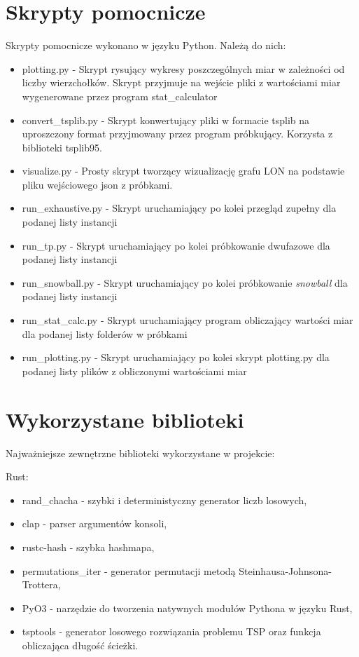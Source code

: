 \section{Skrypty pomocnicze}
Skrypty pomocnicze wykonano w języku Python.
Należą do nich:
\begin{itemize}
    \item plotting.py - Skrypt rysujący wykresy poszczególnych miar w zależności od liczby wierzchołków. Skrypt przyjmuje na wejście pliki z wartościami miar wygenerowane przez program stat\_calculator
    \item convert\_tsplib.py - Skrypt konwertujący pliki w formacie tsplib na uproszczony format przyjmowany przez program próbkujący. Korzysta z biblioteki tsplib95.
    \item visualize.py - Prosty skrypt tworzący wizualizację grafu LON na podstawie pliku wejściowego json z próbkami.
    \item run\_exhaustive.py - Skrypt uruchamiający po kolei przegląd zupełny dla podanej listy instancji
    \item run\_tp.py - Skrypt uruchamiający po kolei próbkowanie dwufazowe dla podanej listy instancji
    \item run\_snowball.py - Skrypt uruchamiający po kolei próbkowanie \textit{snowball} dla podanej listy instancji
    \item run\_stat\_calc.py - Skrypt uruchamiający program obliczający wartości miar dla podanej listy folderów w próbkami
    \item run\_plotting.py - Skrypt uruchamiający po kolei skrypt plotting.py dla podanej listy plików z obliczonymi wartościami miar
\end{itemize}

\section{Wykorzystane biblioteki}
Najważniejsze zewnętrzne biblioteki wykorzystane w projekcie:
\vspace{1em}

Rust:
\begin{itemize}
    \item rand\_chacha - szybki i deterministyczny generator liczb losowych,
    \item clap - parser argumentów konsoli,
    \item rustc-hash - szybka hashmapa,
    \item permutations\_iter - generator permutacji metodą Steinhausa-Johnsona-Trottera,
    \item PyO3 - narzędzie do tworzenia natywnych modułów Pythona w języku Rust,
    \item tsptools - generator losowego rozwiązania problemu TSP oraz funkcja obliczająca długość ścieżki.
\end{itemize}

